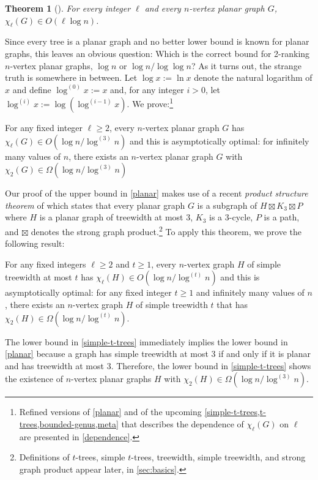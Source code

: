 \documentclass[kpfonts]{patmorin}
\newcommand{\trn}{\chi_2}
\newcommand{\lrn}{\chi_{\ell}}
\newtheorem{othertheorem}{Theorem}
\theoremstyle{named}
\begin{document}
\setcounter{othertheorem}{15}
\begin{othertheorem}[\cite{karpas.neiman.ea:on}]\label{planar-graphs}
    For every integer $\ell$ and every $n$-vertex planar graph $G$, $\lrn(G)\in O(\ell\log n)$.
\end{othertheorem}

Since every tree is a planar graph and no better lower bound is known for planar graphs, this leaves an obvious question:  Which is the correct bound for 2-ranking $n$-vertex planar graphs, $\log n$ or $\log n/\log\log n$?  As it turns out, the strange truth is somewhere in between.  Let $\log x :=\ln x$ denote the natural logarithm of $x$ and define $\log^{(0)}x:=x$ and, for any integer $i>0$, let $\log^{(i)}x:=\log(\log^{(i-1)} x)$. We prove:\footnote{Refined versions of \cref{planar} and of the upcoming \cref{simple-t-trees,t-trees,bounded-genus,meta} that describes the dependence of $\lrn(G)$ on $\ell$ are presented in \cref{dependence}.}


\begin{thm}\label{planar}
    For any fixed integer $\ell\ge 2$, every $n$-vertex planar graph $G$ has $\lrn(G)\in O(\log n/\log^{(3)} n)$ and this is asymptotically optimal: for infinitely many values of $n$, there exists an $n$-vertex planar graph $G$ with $\trn(G)\in \Omega(\log n/\log^{(3)} n)$
\end{thm}


Our proof of the upper bound in \cref{planar} makes use of a recent \emph{product structure theorem} of \citet{dujmovic.joret.ea:planar} which states that every planar graph $G$ is a subgraph of $H\boxtimes K_3\boxtimes P$ where $H$ is a planar graph of treewidth at most $3$, $K_3$ is a 3-cycle, $P$ is a path, and $\boxtimes$ denotes the strong graph product.\footnote{Definitions of $t$-trees, simple $t$-trees, treewidth, simple treewidth, and strong graph product appear later, in \cref{sec:basics}.}  To apply this theorem, we prove the following result:

\begin{thm}\label{simple-t-trees}
    For any fixed integers $\ell\ge 2$ and $t\ge 1$, every $n$-vertex graph $H$ of simple treewidth at most $t$ has $\lrn(H) \in O(\log n/\log^{(t)}n)$ and this is asymptotically optimal: for any fixed integer $t\ge 1$ and infinitely many values of $n$, there exists an $n$-vertex graph $H$ of simple treewidth $t$ that has $\trn(H)\in\Omega(\log n/\log^{(t)} n)$.
\end{thm}

The lower bound in \cref{simple-t-trees} immediately implies the lower bound in \cref{planar} because a graph has simple treewidth at most 3 if and only if it is planar and has treewidth at most 3. Therefore, the lower bound in \cref{simple-t-trees} shows the existence of $n$-vertex planar graphs $H$ with $\trn(H)\in\Omega(\log n/\log^{(3)} n)$.
\end{document}
